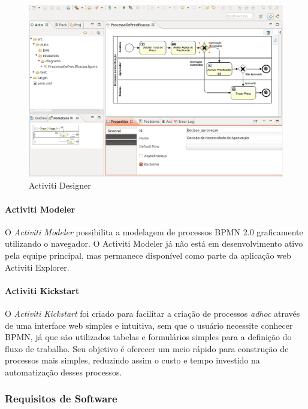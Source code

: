 \begin{figure}[H]
\centering
\includegraphics[width=1\textwidth]{imagens/activiti_designer.png}
\caption{Activiti Designer}
\label{fig:activiti_designer}
\end{figure}

\paragraph{Activiti Modeler}\label{sec:automatizacao_processos-gestao_processos_activiti_modeler}

O \textit{Activiti Modeler} possibilita a modelagem de processos BPMN 2.0 graficamente utilizando o navegador. O Activiti Modeler já não está em desenvolvimento ativo pela equipe principal, mas permanece disponível como parte da aplicação web Activiti Explorer.

\paragraph{Activiti Kickstart}\label{sec:automatizacao_processos-gestao_processos_activiti_kickstart}

O \textit{Activiti Kickstart} foi criado para facilitar a criação de processos \textit{adhoc} através de uma interface web simples e intuitiva, sem que o usuário necessite conhecer BPMN, já que são utilizados tabelas e formulários simples para a definição do fluxo de trabalho. Seu objetivo é oferecer um meio rápido para construção de processos mais simples, reduzindo assim o custo e tempo investido na automatização desses processos.

\subsubsection{Requisitos de Software}\label{sec:automatizacao_processos-requisitos}

